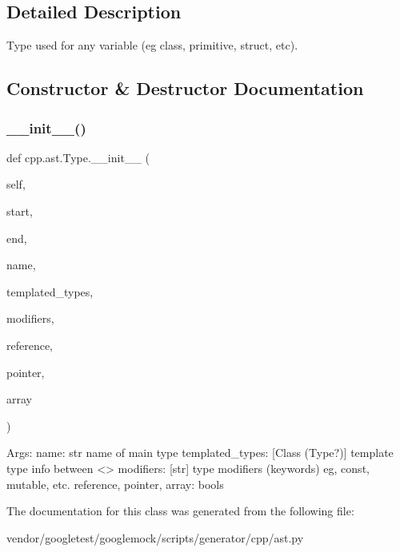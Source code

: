 \subsection{Detailed Description}
\begin{DoxyVerb}Type used for any variable (eg class, primitive, struct, etc).\end{DoxyVerb}
 

\subsection{Constructor \& Destructor Documentation}
\mbox{\label{classcpp_1_1ast_1_1_type_adc20d88db721b5d7b513c08a4d6753c9}} 
\subsubsection{\texorpdfstring{\+\_\+\+\_\+init\+\_\+\+\_\+()}{\_\_init\_\_()}}
{\footnotesize\ttfamily def cpp.\+ast.\+Type.\+\_\+\+\_\+init\+\_\+\+\_\+ (\begin{DoxyParamCaption}\item[{}]{self,  }\item[{}]{start,  }\item[{}]{end,  }\item[{}]{name,  }\item[{}]{templated\+\_\+types,  }\item[{}]{modifiers,  }\item[{}]{reference,  }\item[{}]{pointer,  }\item[{}]{array }\end{DoxyParamCaption})}

\begin{DoxyVerb}Args:
  name: str name of main type
  templated_types: [Class (Type?)] template type info between <>
  modifiers: [str] type modifiers (keywords) eg, const, mutable, etc.
  reference, pointer, array: bools
\end{DoxyVerb}
 

The documentation for this class was generated from the following file\+:\begin{DoxyCompactItemize}
\item 
vendor/googletest/googlemock/scripts/generator/cpp/ast.\+py\end{DoxyCompactItemize}
